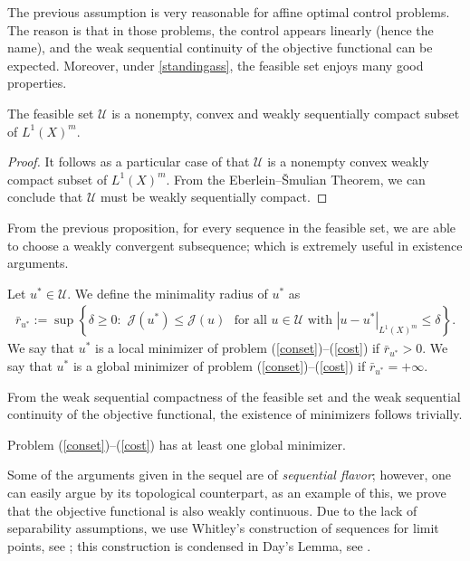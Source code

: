 \documentclass[hidelinks,onefignum,onetabnum]{siamart220329}
\begin{document}
The previous assumption is very reasonable for affine optimal control problems. The reason is that in those problems, the control appears linearly (hence the name), and  the weak sequential continuity of the objective functional can be expected. Moreover, under \cref{standingass}, the feasible set enjoys many good properties.
\begin{proposition}\label{wcfs}
	The  feasible set $\mathcal U$ is a nonempty, convex and weakly sequentially compact subset of ${L^1(X)^m}$.
\end{proposition}
\begin{proof}
	It follows as a particular case of \cite[Theorem 6.4.23]{Anhand} that $\mathcal U$ is a nonempty convex  weakly compact subset of ${L^1(X)^m}$. From the Eberlein–\v Smulian Theorem, we can conclude that $\mathcal U$ must be weakly sequentially compact.
\end{proof}
From the previous proposition, for every sequence in the feasible set, we are able to choose a weakly convergent subsequence; which is extremely useful in existence arguments.
\begin{definition}
	Let $u^*\in\mathcal U$. We define the   minimality radius of $u^*$ as
	\begin{align*}
		\bar r_{u^*}:=\sup\left\lbrace \delta\ge0:\,\,\mathcal J(u^*)\le\mathcal J(u)\,\,\,\,\text{for all $u\in\mathcal U$ with $|u-u^*|_{{L^1(X)^m}}\le\delta$}  \right\rbrace.
	\end{align*}
	We say that $u^*$ is a local minimizer of problem (\ref{conset})--(\ref{cost}) if $\bar r_{u^*}>0$. We say that $u^*$ is a global minimizer of problem (\ref{conset})--(\ref{cost}) if $\bar r_{u^*}=+\infty$.
\end{definition}

From the weak sequential compactness of the feasible set and the weak sequential continuity of the objective functional, the existence of minimizers follows trivially.

\begin{proposition}
Problem  (\ref{conset})--(\ref{cost}) has at least one global minimizer. 
\end{proposition}


\iffalse
Some of the arguments given in the sequel are of \textit{sequential flavor}; however, one can easily argue by its topological counterpart, as an example of this, we prove that the objective functional is also weakly continuous. 
Due to the lack of separability assumptions, we use Whitley's construction of sequences for limit points, see \cite[pp. 117-118]{Whitley}; this construction is condensed in Day's Lemma, see \cite[Lemma 2.8.5]{Megginson}.
\end{document}
